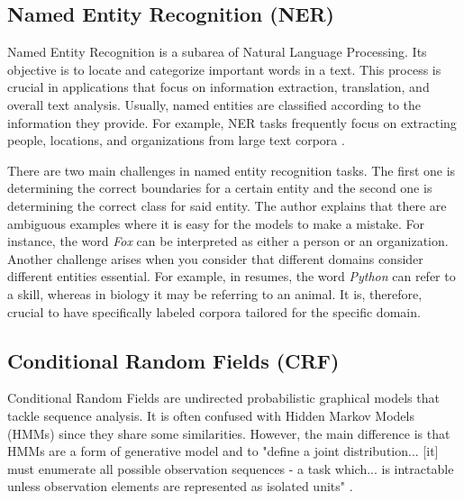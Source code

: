 \documentclass[a4paper, conference]{ieeeconf}
\begin{document}
  \subsection{Named Entity Recognition (NER)}
  Named Entity Recognition is a subarea of Natural Language Processing. Its
  objective is to locate and categorize important words in a text. This process
  is crucial in applications that focus on information extraction, translation,
  and overall text analysis. Usually, named entities are classified according
  to the information they provide. For example, NER tasks frequently focus on
  extracting people, locations, and organizations from large text corpora
  \cite{Mohit2014}.

  There are two main challenges in named entity recognition tasks. The first
  one is determining the correct boundaries for a certain entity and the second
  one is determining the correct class for said entity. The author explains
  that there are ambiguous examples where it is easy for the models to make a
  mistake. For instance, the word \textit{Fox} can be interpreted as either a
  person or an organization. Another challenge arises when you consider that
  different domains consider different entities essential. For example, in
  resumes, the word \textit{Python} can refer to a skill, whereas in biology it
  may be referring to an animal. It is, therefore, crucial to have specifically
  labeled corpora tailored for the specific domain. \cite{Mohit2014}

  \subsection{Conditional Random Fields (CRF)}
  Conditional Random Fields are undirected probabilistic graphical models
  that tackle sequence analysis. It is often confused with Hidden Markov Models
  (HMMs) since they share some similarities. However, the main difference is
  that HMMs are a form of generative model and to "define a joint
  distribution... [it] must enumerate all possible observation sequences
  - a task which... is intractable unless observation elements are
  represented as isolated units" \cite{Wallach2004}.
\end{document}
